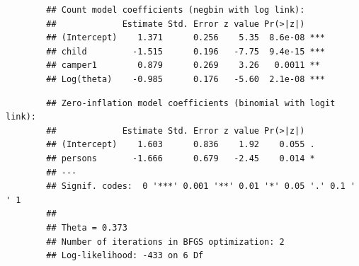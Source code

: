 \documentclass[MASTER.tex]{subfiles}
\begin{document}
\begin{frame}[fragile]
	\begin{verbatim}
		## Count model coefficients (negbin with log link):
		##             Estimate Std. Error z value Pr(>|z|)    
		## (Intercept)    1.371      0.256    5.35  8.6e-08 ***
		## child         -1.515      0.196   -7.75  9.4e-15 ***
		## camper1        0.879      0.269    3.26   0.0011 ** 
		## Log(theta)    -0.985      0.176   -5.60  2.1e-08 ***
\end{verbatim}
\end{frame}
\begin{frame}[fragile]
	\begin{verbatim}
		## Zero-inflation model coefficients (binomial with logit link):
		##             Estimate Std. Error z value Pr(>|z|)  
		## (Intercept)    1.603      0.836    1.92    0.055 .
		## persons       -1.666      0.679   -2.45    0.014 *
		## ---
		## Signif. codes:  0 '***' 0.001 '**' 0.01 '*' 0.05 '.' 0.1 ' ' 1 
		## 
		## Theta = 0.373 
		## Number of iterations in BFGS optimization: 2 
		## Log-likelihood: -433 on 6 Df
\end{verbatim}
\end{frame}
\end{document}
